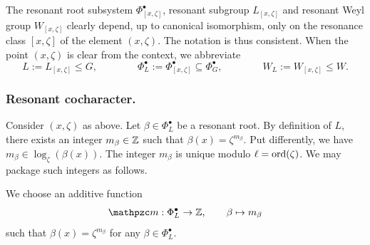 The resonant root subsystem $\Phi^{\bullet}_{[x, \zeta]}$, resonant subgroup $L_{[x, \zeta]}$ and resonant Weyl group $W_{[x, \zeta]}$ clearly depend, up to canonical isomorphism, only on the resonance class $[x, \zeta]$ of the element $(x, \zeta)$. 
%
The notation is thus consistent.
%
When the point $(x, \zeta)$ is clear from the context, we abbreviate
\begin{equation*}
L := L_{[x, \zeta]} \leq G, \qquad \qquad \Phi^{\bullet}_L := \Phi^{\bullet}_{[x, \zeta]} \subseteq \Phi^{\bullet}_G, \qquad \qquad W_L := W_{[x, \zeta]} \leq W. 
\end{equation*}



\subsubsection{Resonant cocharacter.}
Consider $(x, \zeta)$ as above.
Let $\beta \in \Phi^{\bullet}_L$ be a resonant root. By definition of $L$, there exists an integer $m_{\beta} \in \operatorname{\mathbb{Z}}$ such that $\beta(x) = \zeta^{m_{\beta}}$. Put differently, we have $m_{\beta} \in \log_{\zeta}(\beta(x))$. The integer $m_{\beta}$ is unique modulo $\ell = \mathrm{ord}(\zeta)$. We may package such integers as follows.

\begin{construction}\label{notation: additive function m}
We choose an additive function   
\begin{equation*}
   \mm : \Phi^{\bullet}_L \to \Z, \qquad \beta \mapsto m_{\beta}
\end{equation*}
such that $\beta(x) = \zeta^{m_{\beta}}$ for any $\beta \in \Phi^{\bullet}_L$.
\end{construction}

